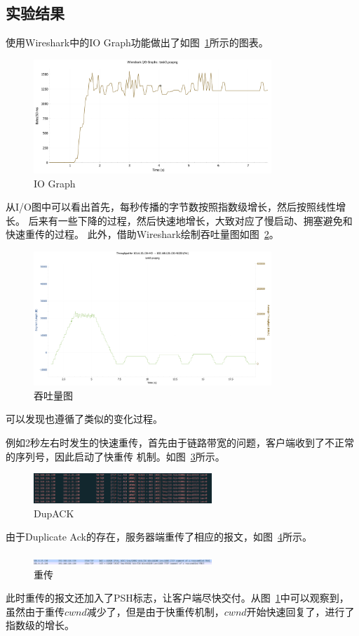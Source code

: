 \documentclass[a4paper,twoside]{article}
\begin{document}
\begin{spacing}{1.2}
\subsection{实验结果}

使用Wireshark中的IO Graph功能做出了如图~\ref{fig:io}所示的图表。
\begin{figure}[htb]
	\centering
	\caption{IO Graph}
	\label{fig:io}
	\includegraphics[width=0.8\textwidth]{io.pdf}
\end{figure}
从I/O图中可以看出首先，每秒传播的字节数按照指数级增长，然后按照线性增长。
后来有一些下降的过程，然后快速地增长，大致对应了慢启动、拥塞避免和快速重传的过程。
此外，借助Wireshark绘制吞吐量图如图~\ref{fig:tp}。
\begin{figure}[htb]
	\centering
	\caption{吞吐量图}
	\label{fig:tp}
	\includegraphics[width=0.8\textwidth]{tp.pdf}
\end{figure}
可以发现也遵循了类似的变化过程。

例如2秒左右时发生的快速重传，首先由于链路带宽的问题，客户端收到了不正常的序列号，因此启动了快重传
机制。如图~\ref{fig:dupack}所示。
\begin{figure}[htb]
	\centering
	\caption{DupACK}
	\label{fig:dupack}
	\includegraphics[width=0.6\textwidth]{dupack.png}
\end{figure}
由于Duplicate Ack的存在，服务器端重传了相应的报文，如图~\ref{fig:dupack2}所示。
\begin{figure}[htb]
	\centering
	\caption{重传}
	\label{fig:dupack2}
	\includegraphics[width=0.6\textwidth]{retra.png}
\end{figure}
此时重传的报文还加入了PSH标志，让客户端尽快交付。从图~\ref{fig:io}中可以观察到，
虽然由于重传$cwnd$减少了，但是由于快重传机制，$cwnd$开始快速回复了，进行了
指数级的增长。



\end{spacing}
\end{document}
